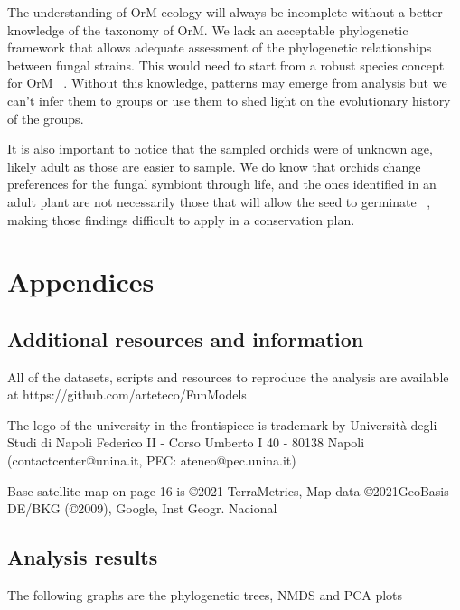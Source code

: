 The understanding of OrM ecology will always be incomplete without a better knowledge of the taxonomy of OrM. We lack an acceptable phylogenetic framework that allows adequate assessment of the phylogenetic relationships between fungal strains. This would need to start from a robust species concept for OrM ~\citep{jacquemyn2017}. Without this knowledge, patterns may emerge from analysis but we can't infer them to groups or use them to shed light on the evolutionary history of the groups.

It is also important to notice that the sampled orchids were of unknown age, likely adult as those are easier to sample. We do know that orchids change preferences for the fungal symbiont through life, and the ones identified in an adult plant are not necessarily those that will allow the seed to germinate ~\citep{meng2019}, making those findings difficult to apply in a conservation plan.

\part{Appendices}
\label{appendices}

\chapter{Additional resources and information}
\label{additionalresourcesandinformation}

All of the datasets, scripts and resources to reproduce the analysis are available at https:\slash \slash github.com\slash arteteco\slash FunModels

The logo of the university in the frontispiece is trademark by Università degli Studi di Napoli Federico II - Corso Umberto I 40 - 80138 Napoli (contactcenter@unina.it, PEC: ateneo@pec.unina.it)

Base satellite map on page 16 is ©2021 TerraMetrics, Map data ©2021GeoBasis-DE\slash BKG (©2009), Google, Inst Geogr. Nacional

\chapter{Analysis results}
\label{analysisresults}

The following graphs are the phylogenetic trees, NMDS and PCA plots

